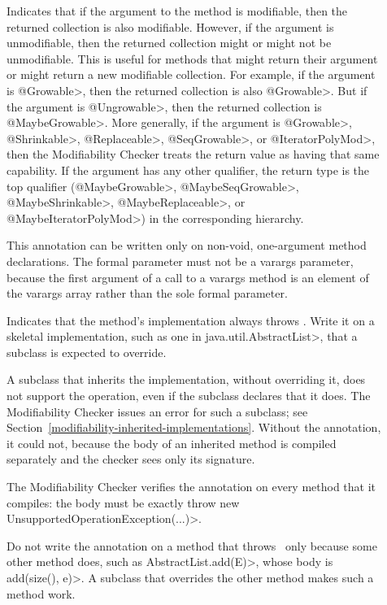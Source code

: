\begin{description}

\item[]
Indicates that if the argument to the method is modifiable, then the returned collection is
also modifiable. However, if the argument is unmodifiable, then the returned collection might or might
not be unmodifiable. This is useful for methods that might return their argument or might return a
new modifiable collection.
For example, if the argument is \<@Growable>, then the returned collection is also
\<@Growable>. But if the argument is \<@Ungrowable>, then the returned collection is \<@MaybeGrowable>.
More generally, if the argument is \<@Growable>, \<@Shrinkable>,
\<@Replaceable>, \<@SeqGrowable>, or \<@IteratorPolyMod>, then the Modifiability Checker
treats the return value as having that same capability. If the argument has
any other qualifier, the return type is the top qualifier (\<@MaybeGrowable>,
\<@MaybeSeqGrowable>, \<@MaybeShrinkable>, \<@MaybeReplaceable>, or \<@MaybeIteratorPolyMod>) in
the corresponding hierarchy.

This annotation can be written only on non-void, one-argument method
declarations.  The formal parameter must not be a varargs parameter, because
the first argument of a call to a varargs method is an element of the varargs
array rather than the sole formal parameter.

\item[]
Indicates that the method's implementation always throws
\UnsupportedOperationException.  Write it on a skeletal implementation, such
as one in \<java.util.AbstractList>, that a subclass is expected to override.

A subclass that inherits the implementation, without overriding it, does not
support the operation, even if the subclass declares that it does.  The
Modifiability Checker issues an error for such a subclass; see
Section~\ref{modifiability-inherited-implementations}.  Without the
annotation, it could not, because the body of an inherited method is compiled
separately and the checker sees only its signature.

The Modifiability Checker verifies the annotation on every method that it
compiles:  the body must be exactly
\<throw new UnsupportedOperationException(...)>.

Do not write the annotation on a method that throws
\UnsupportedOperationException\ only because some other method does, such as
\<AbstractList.add(E)>, whose body is \<add(size(), e)>.  A subclass that
overrides the other method makes such a method work.

\end{description}

